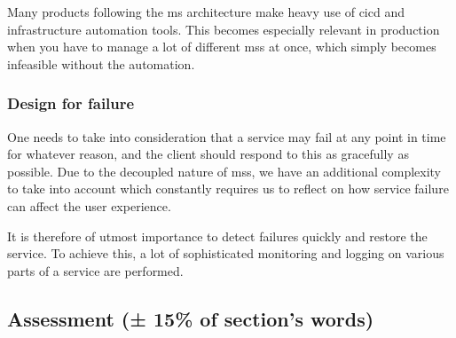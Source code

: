 Many products following the \gls{ms} architecture make heavy use of
\gls{cicd} and infrastructure automation tools. This becomes
especially relevant in production when you have to manage a lot of
different \glspl{ms} at once, which simply becomes infeasible without
the automation.

\subsubsection{Design for failure}

One needs to take into consideration that a service may fail at any
point in time for whatever reason, and the client should respond to
this as gracefully as possible. Due to the decoupled nature of
\glspl{ms}, we have an additional complexity to take into account
which constantly requires us to reflect on how service failure can
affect the user experience.

It is therefore of utmost importance to detect failures quickly and
restore the service. To achieve this, a lot of sophisticated
monitoring and logging on various parts of a service are performed.


\subsection{Assessment (± 15\% of section's words)}


